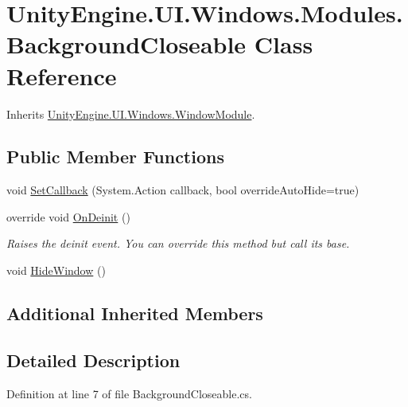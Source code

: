 \hypertarget{class_unity_engine_1_1_u_i_1_1_windows_1_1_modules_1_1_background_closeable}{}\section{Unity\+Engine.\+U\+I.\+Windows.\+Modules.\+Background\+Closeable Class Reference}
\label{class_unity_engine_1_1_u_i_1_1_windows_1_1_modules_1_1_background_closeable}


Inherits \hyperlink{class_unity_engine_1_1_u_i_1_1_windows_1_1_window_module}{Unity\+Engine.\+U\+I.\+Windows.\+Window\+Module}.

\subsection*{Public Member Functions}
\begin{DoxyCompactItemize}
\item 
void \hyperlink{class_unity_engine_1_1_u_i_1_1_windows_1_1_modules_1_1_background_closeable_a7e6fc72c6e820dbbbfdd28b50730b656}{Set\+Callback} (System.\+Action callback, bool override\+Auto\+Hide=true)
\item 
override void \hyperlink{class_unity_engine_1_1_u_i_1_1_windows_1_1_modules_1_1_background_closeable_a56f9be6f385591528eedfedd676a144b}{On\+Deinit} ()
\begin{DoxyCompactList}\small\item\em Raises the deinit event. You can override this method but call it\textquotesingle{}s base. \end{DoxyCompactList}\item 
void \hyperlink{class_unity_engine_1_1_u_i_1_1_windows_1_1_modules_1_1_background_closeable_a1f73a3676bcea64324bca728b025bd2f}{Hide\+Window} ()
\end{DoxyCompactItemize}
\subsection*{Additional Inherited Members}


\subsection{Detailed Description}


Definition at line 7 of file Background\+Closeable.\+cs.




